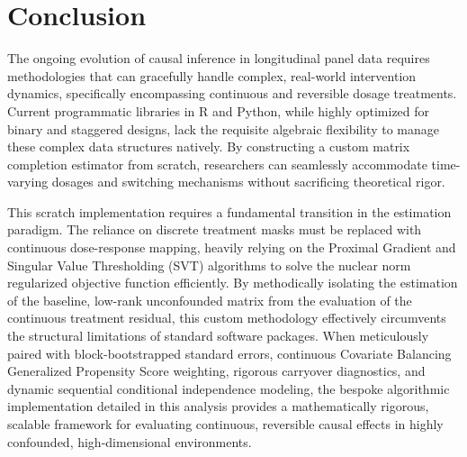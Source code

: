 \documentclass{article}
\begin{document}
\section{Conclusion}

The ongoing evolution of causal inference in longitudinal panel data requires methodologies that can gracefully handle complex, real-world intervention dynamics, specifically encompassing continuous and reversible dosage treatments. Current programmatic libraries in R and Python, while highly optimized for binary and staggered designs, lack the requisite algebraic flexibility to manage these complex data structures natively. By constructing a custom matrix completion estimator from scratch, researchers can seamlessly accommodate time-varying dosages and switching mechanisms without sacrificing theoretical rigor.

This scratch implementation requires a fundamental transition in the estimation paradigm. The reliance on discrete treatment masks must be replaced with continuous dose-response mapping, heavily relying on the Proximal Gradient and Singular Value Thresholding (SVT) algorithms to solve the nuclear norm regularized objective function efficiently. By methodically isolating the estimation of the baseline, low-rank unconfounded matrix from the evaluation of the continuous treatment residual, this custom methodology effectively circumvents the structural limitations of standard software packages. When meticulously paired with block-bootstrapped standard errors, continuous Covariate Balancing Generalized Propensity Score weighting, rigorous carryover diagnostics, and dynamic sequential conditional independence modeling, the bespoke algorithmic implementation detailed in this analysis provides a mathematically rigorous, scalable framework for evaluating continuous, reversible causal effects in highly confounded, high-dimensional environments.
\end{document}
